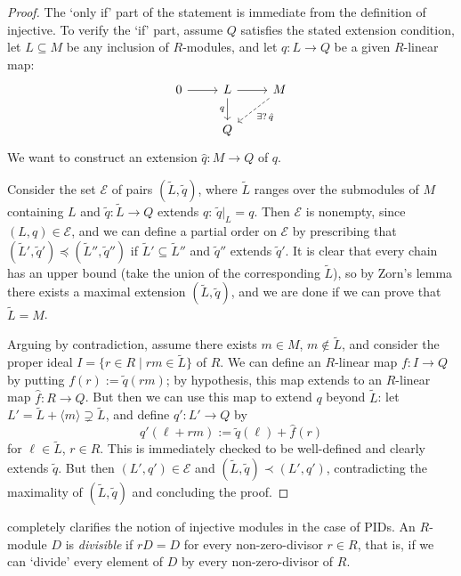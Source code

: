 \begin{proof}
  The `only if' part of the statement is immediate from the definition
  of injective. To verify the `if' part, assume $Q$ satisfies the
  stated extension condition, let $L \subseteq M$ be any inclusion of
  $R$-modules, and let $q : L \to Q$ be a given $R$-linear map:
  \[
    \begin{tikzcd}
      0 \ar[r] & L \ar[r] \ar[d, "q"'] & M \ar[dl, dashed,
      "\exists?\,\hat{q}"] \\
      & Q
    \end{tikzcd}
  \]
  We want to construct an extension $\hat{q} : M \to Q$ of $q$.

  Consider the set $\mathscr{E}$ of pairs $(\tilde{L}, \tilde{q})$,
  where $\tilde{L}$ ranges over the submodules of $M$ containing $L$
  and $\tilde{q} : \tilde{L} \to Q$ extends $q$: $\tilde{q}|_L =
  q$. Then $\mathscr{E}$ is nonempty, since $(L, q) \in \mathscr{E}$,
  and we can define a partial order on $\mathscr{E}$ by prescribing
  that $(\tilde{L}', \tilde{q}') \preceq (\tilde{L}'', \tilde{q}'')$
  if $\tilde{L}' \subseteq \tilde{L}''$ and $\tilde{q}''$ extends
  $\tilde{q}'$. It is clear that every chain has an upper bound (take
  the union of the corresponding $\tilde{L}$), so by Zorn's lemma
  there exists a maximal extension $(\tilde{L}, \tilde{q})$, and we
  are done if we can prove that $\tilde{L} = M$.

  Arguing by contradiction, assume there exists $m \in M$,
  $m \notin \tilde{L}$, and consider the proper ideal
  $I = \{r \in R \mid rm \in \tilde{L}\}$ of $R$. We can define an
  $R$-linear map $f : I \to Q$ by putting $f(r) := \tilde{q}(rm)$; by
  hypothesis, this map extends to an $R$-linear map
  $\hat{f} : R \to Q$. But then we can use this map to extend $q$
  beyond $\tilde{L}$: let
  $L' = \tilde{L} + \langle m \rangle \supsetneq \tilde{L}$, and
  define $q' : L' \to Q$ by
  \[
    q'(\ell + rm) := \tilde{q}(\ell) + \hat{f}(r)
  \]
  for $\ell \in \tilde{L}$, $r \in R$. This is immediately checked to
  be well-defined and clearly extends $\tilde{q}$. But then
  $(L', q') \in \mathscr{E}$ and
  $(\tilde{L}, \tilde{q}) \prec (L', q')$, contradicting the
  maximality of $(\tilde{L}, \tilde{q})$ and concluding the proof.
\end{proof}

 completely clarifies the notion of injective
modules in the case of PIDs. An $R$-module $D$ is \emph{divisible} if
$rD = D$ for every non-zero-divisor $r \in R$, that is, if we can
`divide' every element of $D$ by every non-zero-divisor of $R$.

